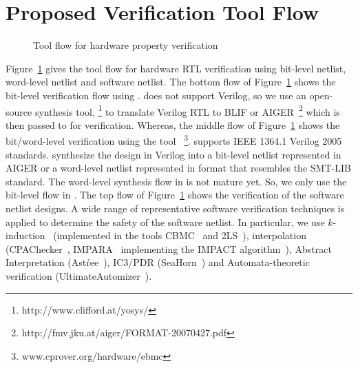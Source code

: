 \section{Proposed Verification Tool Flow}
%
\begin{figure}[t]
\centering
\vspace*{0.3cm}
\caption{Tool flow for hardware property verification\label{fig:toolflow}}
\end{figure}
%
%
Figure~\ref{fig:toolflow} gives the tool flow for hardware RTL 
verification using bit-level netlist, word-level netlist and software netlist.  
The bottom flow of Figure~\ref{fig:toolflow} shows the bit-level 
verification flow using \ABC.
\ABC does not support Verilog, so we use an open-source synthesis tool,
\yosys\footnote{http://www.clifford.at/yosys/} to translate Verilog
RTL to BLIF or AIGER~\footnote{http://fmv.jku.at/aiger/FORMAT-20070427.pdf} 
which is then passed to \ABC for verification. 
Whereas, the middle flow of Figure~\ref{fig:toolflow} shows the 
bit/word-level verification using the tool 
\ebmc~\footnote{www.cprover.org/hardware/ebmc}. 
\ebmc supports IEEE 1364.1 Verilog 2005 standards.  \ebmc synthesize 
the design in Verilog into a bit-level netlist represented in AIGER or a 
word-level netlist represented in format that resembles the 
SMT-LIB standard. The word-level synthesis flow in \ebmc is not mature yet. 
So, we only use the bit-level flow in \ebmc. 
%
The top flow of Figure~\ref{fig:toolflow} shows the verification 
of the software netlist designs. 
%
A wide range of representative software 
verification techniques is applied to determine the safety of the
software netlist. In particular, we use $k$-induction~\cite{SSS00}
(implemented in the tools CBMC~\cite{cbmc.tacas:2004} and
2LS~\cite{BJKS15}), interpolation
(CPAChecker~\cite{DBLP:conf/cav/BeyerK11}, IMPARA~\cite{impara}
implementing the IMPACT algorithm~\cite{cav03}), Abstract Interpretation
(Ast{\'r}ee~\cite{DBLP:conf/esop/CousotCFMMMR05}), IC3/PDR
(SeaHorn~\cite{DBLP:conf/cav/GurfinkelKKN15}) and Automata-theoretic 
verification (UltimateAutomizer~\cite{DBLP:conf/tacas/HeizmannDGLMSP16}).
%
